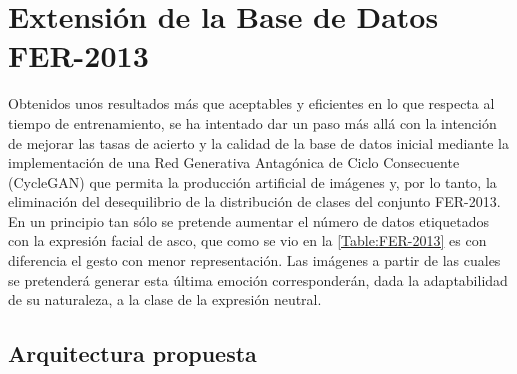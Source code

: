 \chapter{Extensión de la Base de Datos FER-2013 } \label{Chapter:6}

Obtenidos unos resultados más que aceptables y eficientes en lo que respecta al tiempo de entrenamiento, se ha intentado dar un paso más allá con la intención de mejorar las tasas de acierto y la calidad de la base de datos inicial mediante la implementación de una Red Generativa Antagónica de Ciclo Consecuente (CycleGAN) \cite{cycleGAN} que permita la producción artificial de imágenes y, por lo tanto, la eliminación del desequilibrio de la distribución de clases del conjunto FER-2013. En un principio tan sólo se pretende aumentar el número de datos etiquetados con la expresión facial de asco, que como se vio en la \autoref{Table:FER-2013} es con diferencia el gesto con menor representación. Las imágenes a partir de las cuales se pretenderá generar esta última emoción corresponderán, dada la adaptabilidad de su naturaleza, a la clase de la expresión neutral.

\section{Arquitectura propuesta}

